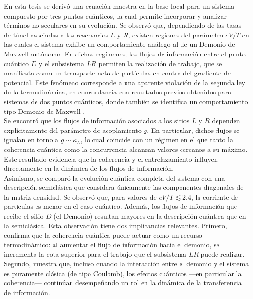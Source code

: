 En esta tesis se derivó una ecuación maestra en la base local para un sistema compuesto por tres puntos cuánticos, la cual permite incorporar y analizar términos no seculares en su evolución. Se observó que, dependiendo de las tasas de túnel asociadas a los reservorios $L$ y $R$, existen regiones del parámetro $eV/T$ en las cuales el sistema exhibe un comportamiento análogo al de un Demonio de Maxwell autónomo. En dichos regímenes, los flujos de información entre el punto cuántico $D$ y el subsistema $LR$ permiten la realización de trabajo, que se manifiesta como un transporte neto de partículas en contra del gradiente de potencial. Este fenómeno corresponde a una aparente violación de la segunda ley de la termodinámica, en concordancia con resultados previos obtenidos para sistemas de dos puntos cuánticos, donde también se identifica un comportamiento tipo Demonio de Maxwell \cite{horowitz2014thermodynamics}.
\\

Se encontró que los flujos de información asociados a los sitios $L$ y $R$ dependen explícitamente del parámetro de acoplamiento $g$. En particular, dichos flujos se igualan en torno a $g \sim \kappa_L$, lo cual coincide con un régimen en el que tanto la coherencia cuántica como la concurrencia alcanzan valores cercanos a su máximo. Este resultado evidencia que la coherencia y el entrelazamiento influyen directamente en la dinámica de los flujos de información.
\\

Asimismo, se comparó la evolución cuántica completa del sistema con una descripción semiclásica que considera únicamente las componentes diagonales de la matriz densidad. Se observó que, para valores de $eV/T \lesssim 2.4$, la corriente de partículas es menor en el caso cuántico. Además, los flujos de información que recibe el sitio $D$ (el Demonio) resultan mayores en la descripción cuántica que en la semiclásica. Esta observación tiene dos implicancias relevantes. Primero, confirma que la coherencia cuántica puede actuar como un recurso termodinámico: al aumentar el flujo de información hacia el demonio, se incrementa la cota superior para el trabajo que el subsistema $LR$ puede realizar. Segundo, muestra que, incluso cuando la interacción entre el demonio y el sistema es puramente clásica (de tipo Coulomb), los efectos cuánticos —en particular la coherencia— continúan desempeñando un rol en la dinámica de la transferencia de información.
\\

